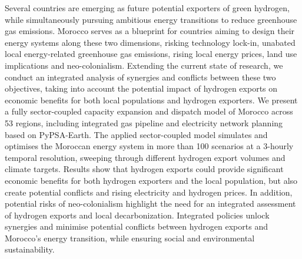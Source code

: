 Several countries are emerging as future potential exporters of green hydrogen, while simultaneously pursuing ambitious energy transitions to reduce greenhouse gas emissions. 
Morocco serves as a blueprint for countries aiming to design their energy systems along these two dimensions, risking technology lock-in, unabated local energy-related greenhouse gas emissions, rising local energy prices, land use implications and neo-colonialism. 
Extending the current state of research, we conduct an integrated analysis of synergies and conflicts between these two objectives, taking into account the potential impact of hydrogen exports on economic benefits for both local populations and hydrogen exporters. We present a fully sector-coupled capacity expansion and dispatch model of Morocco across 53 regions, including integrated gas pipeline and electricity network planning based on PyPSA-Earth. The applied sector-coupled model simulates and optimises the Moroccan energy system in more than 100 scenarios at a 3-hourly temporal resolution, sweeping through different hydrogen export volumes and climate targets. 
Results show that hydrogen exports could provide significant economic benefits for both hydrogen exporters and the local population, but also create potential conflicts and rising electricity and hydrogen prices.
In addition, potential risks of neo-colonialism highlight the need for an integrated assessment of hydrogen exports and local decarbonization. Integrated policies unlock synergies and minimise potential conflicts between hydrogen exports and Morocco's energy transition, while ensuring social and environmental sustainability.
